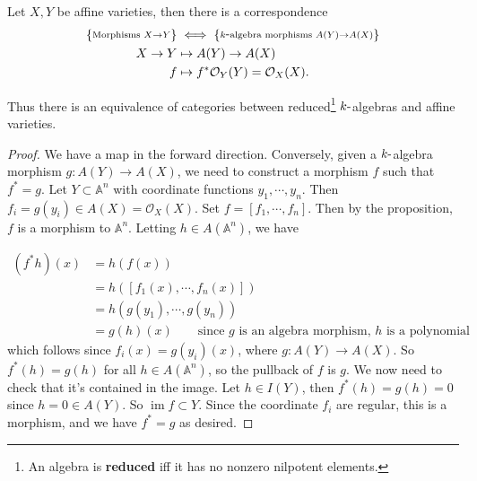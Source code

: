 \begin{corollary}

Let \(X, Y\) be affine varieties, then there is a correspondence
\begin{align*}  
\left\{{\substack{\text{Morphisms } X\to Y }}\right\}
&\iff
\left\{{\substack{k{\hbox{-}}\text{algebra morphisms } A(Y) \to A(X)}}\right\} \\
X\to Y &\mapsto A(Y) \to A(X) \\
f &\mapsto f^* {\mathcal{O}}_Y(Y) = {\mathcal{O}}_X(X)
.\end{align*}

Thus there is an equivalence of categories between reduced\footnote{An
  algebra is \textbf{reduced} iff it has no nonzero nilpotent elements.}
\(k{\hbox{-}}\)algebras and affine varieties.

\end{corollary}

\begin{proof}

We have a map in the forward direction. Conversely, given a
\(k{\hbox{-}}\)algebra morphism \(g:A(Y) \to A(X)\), we need to
construct a morphism \(f\) such that \(f^* = g\). Let
\(Y\subset {\mathbb{A}}^n\) with coordinate functions
\(y_1, \cdots, y_n\). Then
\(f_i = g(y_i) \in A(X) = {\mathcal{O}}_X(X)\). Set
\(f = {\left[ {f_1, \cdots, f_n} \right]}\). Then by the proposition,
\(f\) is a morphism to \({\mathbb{A}}^n\). Letting
\(h\in A({\mathbb{A}}^n)\), we have

\begin{align*}
(f^*h)(x) 
&= h(f(x)) \\
&= h({\left[ {f_1(x) , \cdots, f_n(x)} \right]}) \\
&= h(g(y_1), \cdots, g(y_n)) \\ 
&= g(h)(x) \qquad\text{since $g$ is an algebra morphism, $h$ is a polynomial}
\end{align*}
which follows since \(f_i(x) = g(y_i)(x)\), where \(g:A(Y) \to A(X)\).
So \(f^*(h) = g(h)\) for all \(h\in A({\mathbb{A}}^n)\), so the pullback
of \(f\) is \(g\). We now need to check that it's contained in the
image. Let \(h\in I(Y)\), then \(f^*(h) = g(h) = 0\) since
\(h = 0 \in A(Y)\). So \(\operatorname{im}f \subset Y\). Since the
coordinate \(f_i\) are regular, this is a morphism, and we have
\(f^* = g\) as desired.

\end{proof}

